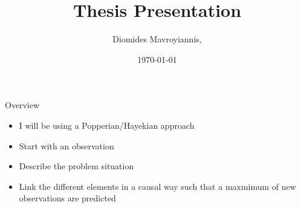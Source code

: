 \documentclass{beamer}
\title[Thesis Presentation]{Thesis Presentation} %
\author{ Diomides Mavroyiannis, } %
\institute[Dauphine] %
{
PSL/Paris Dauphine \\ %
\medskip%
}
\date{\today} %
\numberwithin{equation}{section}
\begin{document}
\begin{frame}
\titlepage %
\end{frame}

\begin{frame}{Overview}
\tableofcontents
\end{frame}

\begin{frame}
\begin{itemize}
    \item I will be using a Popperian/Hayekian approach
    \item Start with an observation
    \item Describe the problem situation
    \item Link the different elements in a causal way such that a maxmimum of new observations are predicted
\end{itemize}
\end{frame}

\end{document}

